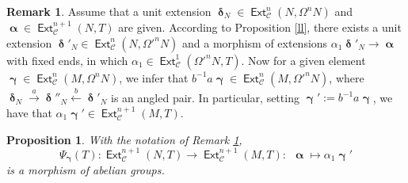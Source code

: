 \documentclass[11pt,a4paper]{amsart}
\newcommand{\rt}{\rightarrow}
\newcommand{\lrt}{\longrightarrow}
\newcommand{\lf}{\leftarrow}
\newcommand{\st}{\stackrel}
\newcommand{\C}{\mathscr{C} }
\def\Ext{\operatorname{{\mathsf{Ext}}}}
\def\syz{\mathsf{\Omega}}
\def\al{\operatorname{\boldsymbol{\alpha}}}
\def\ga{\operatorname{\boldsymbol{\gamma}}}
\def\de{\operatorname{\boldsymbol{\delta}}}
\newtheorem{prop}[theorem]{Proposition}
\theoremstyle{definition}
\newtheorem{rem}[theorem]{Remark}
\theoremstyle{plain}
\theoremstyle{definition}
\numberwithin{equation}{section}
\begin{document}
\begin{rem}\label{3s1}Assume that a unit extension $\de_N\in\Ext^n_{\C}(N, \syz^nN)$ and  $\al\in\Ext^{n+1}_{\C}(N, T)$ are given. According to Proposition \ref{ll}, there exists a unit extension $\de'_N\in\Ext^{n}_{\C}(N, {\syz'}^nN)$ and a morphism of extensions $\alpha_1\de'_N\lrt\al$ with fixed ends, in which $\alpha_1\in\Ext^1_{\C}({\syz'}^nN, T)$.
Now for a given element $\ga\in\Ext^n_{\C}(M, \syz^nN)$, we infer that $b^{-1}a\ga\in\Ext^n_{\C}(M, {\syz'}^nN)$, where $\de_N\st{a}\rt\de''_N\st{b}\lf\de'_N$ is an angled pair. In particular, setting $\ga':=b^{-1}a\ga$, we have that $\alpha_1\ga'\in\Ext^{n+1}_{\C}(M, T)$.
\end{rem}
\begin{prop}\label{3p1}With the notation of  Remark \ref{3s1}, $$\Psi_{\ga}(T):\Ext^{n+1}_{\C}(N, T)\lrt\Ext^{n+1}_{\C}(M, T):~~ \al\mapsto\alpha_1\ga'$$ is a morphism of abelian groups.
\end{prop}
\end{document}

